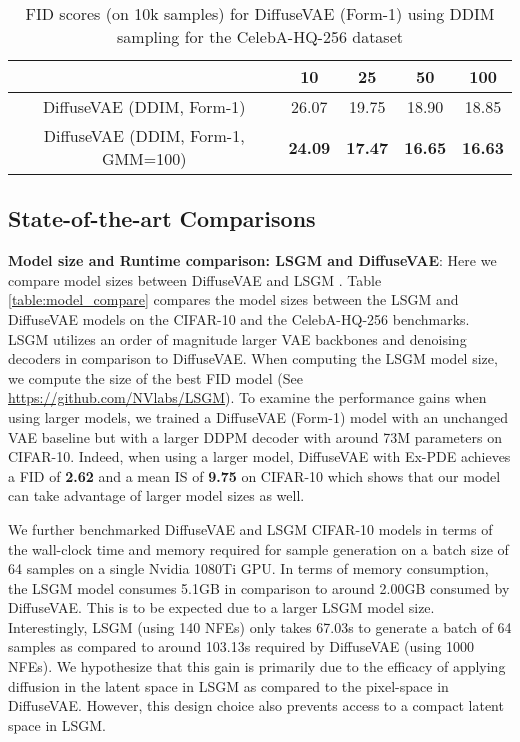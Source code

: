 \documentclass[10pt]{article} \usepackage[accepted]{tmlr}
\begin{document}
\begin{table}[]
\footnotesize
\centering
\begin{tabular}{@{}ccccc@{}}
\toprule
                                   & 10             & 25             & 50             & 100            \\ \midrule
DiffuseVAE (DDIM, Form-1)          & 26.07          & 19.75          & 18.90          & 18.85          \\
DiffuseVAE (DDIM, Form-1, GMM=100) & \textbf{24.09} & \textbf{17.47} & \textbf{16.65} & \textbf{16.63} \\ \bottomrule
\end{tabular}
\caption{FID scores (on 10k samples) for DiffuseVAE (Form-1) using DDIM sampling for the CelebA-HQ-256 dataset} 
\label{table:chq256_ddim}
\end{table}


\subsection{State-of-the-art Comparisons}
\label{sec:app_sota}
\textbf{Model size and Runtime comparison: LSGM and DiffuseVAE}: Here we compare model sizes between DiffuseVAE and LSGM \citep{vahdat2021scorebased}. Table \ref{table:model_compare} compares the model sizes between the LSGM and DiffuseVAE models on the CIFAR-10 and the CelebA-HQ-256 benchmarks. LSGM utilizes an order of magnitude larger VAE backbones and denoising decoders in comparison to DiffuseVAE. When computing the LSGM model size, we compute the size of the best FID model (See \url{https://github.com/NVlabs/LSGM}). To examine the performance gains when using larger models, we trained a DiffuseVAE (Form-1) model with an unchanged VAE baseline but with a larger DDPM decoder with around 73M parameters on CIFAR-10. Indeed, when using a larger model, DiffuseVAE with Ex-PDE achieves a FID of \textbf{2.62} and a mean IS of \textbf{9.75} on CIFAR-10 which shows that our model can take advantage of larger model sizes as well.

We further benchmarked DiffuseVAE and LSGM CIFAR-10 models in terms of the wall-clock time and memory required for sample generation on a batch size of 64 samples on a single Nvidia 1080Ti GPU. In terms of memory consumption, the LSGM model consumes 5.1GB in comparison to around 2.00GB consumed by DiffuseVAE. This is to be expected due to a larger LSGM model size. Interestingly, LSGM (using 140 NFEs) only takes 67.03s to generate a batch of 64 samples as compared to around 103.13s required by DiffuseVAE (using 1000 NFEs). We hypothesize that this gain is primarily due to the efficacy of applying diffusion in the latent space in LSGM as compared to the pixel-space in DiffuseVAE. However, this design choice also prevents access to a compact latent space in LSGM.
\end{document}
